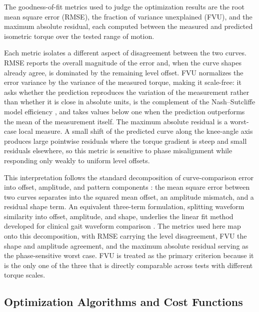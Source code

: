 The goodness-of-fit metrics used to judge the optimization results are the root mean square error (RMSE), the fraction of variance unexplained (FVU), and the maximum absolute residual, each computed between the measured and predicted isometric torque over the tested range of motion.

Each metric isolates a different aspect of disagreement between the two curves. RMSE reports the overall magnitude of the error and, when the curve shapes already agree, is dominated by the remaining level offset. FVU normalizes the error variance by the variance of the measured torque, making it scale-free: it asks whether the prediction reproduces the variation of the measurement rather than whether it is close in absolute units, is the complement of the Nash--Sutcliffe model efficiency \citep{nash_river_1970}, and takes values below one when the prediction outperforms the mean of the measurement itself. The maximum absolute residual is a worst-case local measure. A small shift of the predicted curve along the knee-angle axis produces large pointwise residuals where the torque gradient is steep and small residuals elsewhere, so this metric is sensitive to phase misalignment while responding only weakly to uniform level offsets.

This interpretation follows the standard decomposition of curve-comparison error into offset, amplitude, and pattern components \citep{taylor_summarizing_2001}: the mean square error between two curves separates into the squared mean offset, an amplitude mismatch, and a residual shape term. An equivalent three-term formulation, splitting waveform similarity into offset, amplitude, and shape, underlies the linear fit method developed for clinical gait waveform comparison \citep{iosa_assessment_2014}. The metrics used here map onto this decomposition, with RMSE carrying the level disagreement, FVU the shape and amplitude agreement, and the maximum absolute residual serving as the phase-sensitive worst case. FVU is treated as the primary criterion because it is the only one of the three that is directly comparable across tests with different torque scales.

\subsection{Optimization Algorithms and Cost Functions}\label{sec:optimization}

